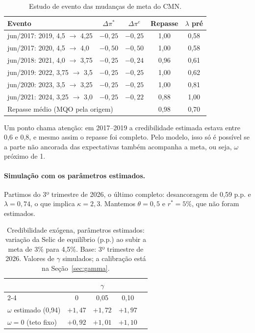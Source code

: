 \documentclass[11pt,a4paper]{article}
\newcommand{\pe}{\pi^{e}}
\newcommand{\meta}{\pi^{*}}
\newcommand{\dmeta}{\Delta\meta}
\begin{document}
\begin{table}[H]
\centering
\begin{tabular}{lcccc}
\toprule
Evento & $\dmeta$ & $\Delta\pe$ & Repasse & $\lambda$ pré \\
\midrule
jun/2017: 2019, 4,5 $\to$ 4,25 & $-0{,}25$ & $-0{,}25$ & 1,00 & 0,58 \\
jun/2017: 2020, 4,5 $\to$ 4,0 & $-0{,}50$ & $-0{,}50$ & 1,00 & 0,58 \\
jun/2018: 2021, 4,0 $\to$ 3,75 & $-0{,}25$ & $-0{,}24$ & 0,96 & 0,61 \\
jun/2019: 2022, 3,75 $\to$ 3,5 & $-0{,}25$ & $-0{,}25$ & 1,00 & 0,62 \\
jun/2020: 2023, 3,5 $\to$ 3,25 & $-0{,}25$ & $-0{,}25$ & 1,00 & 0,81 \\
jun/2021: 2024, 3,25 $\to$ 3,0 & $-0{,}25$ & $-0{,}22$ & 0,88 & 1,00 \\
\midrule
\multicolumn{3}{l}{Repasse médio (MQO pela origem)} & 0,98 & 0,70 \\
\bottomrule
\end{tabular}
\caption{Estudo de evento das mudanças de meta do CMN.}
\end{table}

Um ponto chama atenção: em 2017--2019 a credibilidade estimada estava entre 0,6 e 0,8, e mesmo assim o repasse foi completo. Pelo modelo, isso só é possível se a parte não ancorada das expectativas também acompanha a meta, ou seja, $\omega$ próximo de 1.

\paragraph{Simulação com os parâmetros estimados.} Partimos do 3º trimestre de 2026, o último completo: desancoragem de 0,59 p.p. e $\lambda=0{,}74$, o que implica $\kappa=2{,}3$. Mantemos $\theta=0{,}5$ e $r^{*}=5\%$, que não foram estimados.

\begin{table}[H]
\centering
\begin{tabular}{lcccc}
\toprule
 & \multicolumn{3}{c}{$\gamma$} \\
\cmidrule(lr){2-4}
 & 0 & 0,05 & 0,10 \\
\midrule
$\omega$ estimado (0,94) & $+1{,}47$ & $+1{,}72$ & $+1{,}97$ \\
$\omega = 0$ (teto fixo) & $+0{,}92$ & $+1{,}01$ & $+1{,}10$ \\
\bottomrule
\end{tabular}
\caption{Credibilidade exógena, parâmetros estimados: variação da Selic de equilíbrio (p.p.) ao subir a meta de 3\% para 4,5\%. Base: 3º trimestre de 2026. Valores de $\gamma$ simulados; a calibração está na Seção~\ref{sec:gamma}.}
\label{tab:res_exo}
\end{table}
\end{document}
